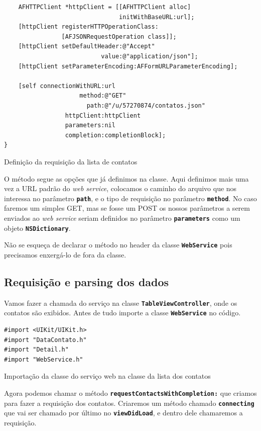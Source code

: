 \documentclass[a4paper,12pt,brazil,doubleside]{book}
\begin{document}
\begin{singlespace}
\begin{listing}[H]
\begin{verbatim}
    AFHTTPClient *httpClient = [[AFHTTPClient alloc]
                                initWithBaseURL:url];
    [httpClient registerHTTPOperationClass:
                [AFJSONRequestOperation class]];
    [httpClient setDefaultHeader:@"Accept"
                           value:@"application/json"];
    [httpClient setParameterEncoding:AFFormURLParameterEncoding];
    
    [self connectionWithURL:url
                     method:@"GET"
                       path:@"/u/57270874/contatos.json"
                 httpClient:httpClient
                 parameters:nil
                 completion:completionBlock];
}
\end{verbatim}
\caption{Definição da requisição da lista de contatos}
\end{listing}


O método segue as opções que já definimos na classe. Aqui definimos mais uma vez a URL padrão do \emph{web service}, colocamos o caminho do arquivo que nos interessa no parâmetro \texttt{\textbf{path}}, e o tipo de requisição no parâmetro \texttt{\textbf{method}}. No caso faremos um simples GET, mas se fosse um POST os nossos parâmetros a serem enviados ao \emph{web service} seriam definidos no parâmetro \texttt{\textbf{parameters}} como um objeto  \texttt{\textbf{NSDictionary}}.

Não se esqueça de declarar o método no header da classe \texttt{\textbf{WebService}} pois precisamos enxergá-lo de fora da classe.

\subsection{Requisição e parsing dos dados}


Vamos fazer a chamada do serviço na classe \texttt{\textbf{TableViewController}}, onde os contatos são exibidos. Antes de tudo importe a classe \texttt{\textbf{WebService}} no código.

\begin{listing}[H]
\begin{verbatim}
#import <UIKit/UIKit.h>
#import "DataContato.h"
#import "Detail.h"
#import "WebService.h"
\end{verbatim}
\caption{Importação da classe do serviço web na classe da lista dos contatos}
\end{listing}


Agora podemos chamar o método \texttt{\textbf{requestContactsWithCompletion:}} que criamos para fazer a requisição dos contatos. Criaremos um método chamado \texttt{\textbf{connecting}} que vai ser chamado por último no \texttt{\textbf{viewDidLoad}}, e dentro dele chamaremos a requisição.


\end{singlespace}
\end{document}
